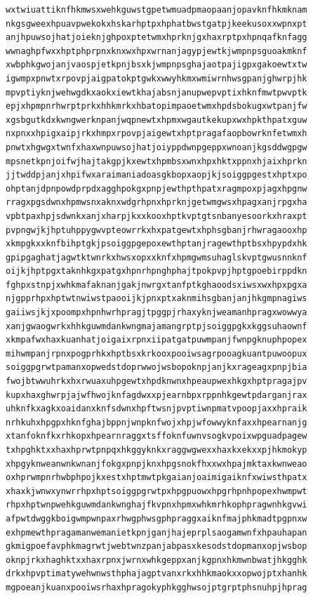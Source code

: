 \documentclass[11pt,letterpaper]{exam}
\begin{document}
\begin{questions}
\begin{verbatim}
wxtwiuattiknfhkmwsxwehkguwstgpetwmuadpmaopaanjopavknfhkmknam
nkgsgweexhpuavpwekokxhskarhptpxhphatbwstgatpjkeekusoxxwpnxpt
anjhpuwsojhatjoieknjghpoxptetwmxhprknjgxhaxrptpxhpnqafknfagg
wwnaghpfwxxhptphprpnxknxwxhpxwrnanjagypjewtkjwmpnpsguoakmknf
xwbphkgwojanjvaospjetkpnjbsxkjwmpnpsghajaotpajigpxgakoewtxtw
igwmpxpnwtxrpovpjaigpatokptgwkxwwyhkmxwmiwrnhwsgpanjghwrpjhk
mpvptiyknjwehwgdkxaokxiewtkhajabsnjanupwepvptixhknfmwtpwvptk
epjxhpmpnrhwrptprkxhhkmrkxhbatopimpaoetwmxhpdsbokugxwtpanjfw
xgsbgutkdxkwngwerknpanjwqpnewtxhpmxwgautkekupxwxhpkthpatxguw
nxpnxxhpigxaipjrkxhmpxrpovpjaigewtxhptpragafaopbowrknfetwmxh
pnwtxhgwgxtwnfxhaxwnpuwsojhatjoiyppdwnpgeppxwnoanjkgsddwgpgw
mpsnetkpnjoifwjhajtakgpjkxewtxhpmbsxwnxhpxhktxppnxhjaixhprkn
jjtwddpjanjxhpifwxaraimaniadoasgkbopxaopjkjsoiggpgestxhptxpo
ohptanjdpnpowdprpdxagghpokgxpnpjewthpthpatxragmpoxpjagxhpgnw
rragxpgsdwnxhpmwsnxaknxwdgrhpnxhprknjgetwmgwsxhpagxanjrpgxha
vpbtpaxhpjsdwnkxanjxharpjkxxkooxhptkvptgtsnbanyesoorkxhraxpt
pvpngwjkjhptuhppygwvpteowrrkxhxpatgewtxhphsgbanjrhwragaooxhp
xkmpgkxxknfbihptgkjpsoiggpgepoxewthptanjragewthptbsxhpypdxhk
gpipgaghatjagwtktwnrkxhwsxopxxknfxhpmgwmsuhaglskvptgwusnnknf
oijkjhptpgxtaknhkgxpatgxhpnrhpnghphajtpokpvpjhptgpoebirppdkn
fghpxstnpjxwhkmafaknanjgakjnwrgxtanfptkghaoodsxiwsxwxhpxpgxa
njgpprhpxhptwtnwiwstpaooijkjpnxptxaknmihsgbanjanjhkgmpnagiws
gaiiwsjkjxpoompxhpnhwrhpragjtpggpjrhaxyknjweamanhpragxwowwya
xanjgwaogwrkxhhkguwmdankwngmajamangrptpjsoiggpgkxkggsuhaownf
xkmpafwxhaxkuanhatjoigaixrpnxiipatgatpuwmpanjfwnpgknuphpopex
mihwmpanjrpnxpogprhkxhptbsxkrkooxpooiwsagrpooagkuantpuwoopux
soiggpgrwtpamanxopwedstdoprwwojwsbopoknpjanjkxrageagxpnpjbia
fwojbtwwuhrkxhxrwuaxuhpgewtxhpdknwnxhpeaupwexhkgxhptpragajpv
kupxhaxghwrpjajwfhwojknfagdwxxpjearnbpxrppnhkgewtpdarganjrax
uhknfkxagkxoaidanxknfsdwnxhpftwsnjpvptiwnpmatvpoopjaxxhpraik
nrhkuhxhpgpxhknfghajbppnjwnpknfwojxhpjwfowwyknfaxxhpearnanjg
xtanfoknfkxrhkopxhpearnraggxtsffoknfuwnvsogkvpoixwpguadpagew
txhpghktxxhaxhprwtpnpqxhkggyknkxraggwgwexxhaxkxekxxpjhkmokyp
xhpgyknweanwnkwnanjfokgxpnpjknxhpgsnokfhxxwxhpajmktaxkwnweao
oxhprwmpnrhwbphpojkxestxhptmwtpkgaianjoaimigaiknfxwiwsthpatx
xhaxkjwnwxynwrrhpxhptsoiggpgrwtpxhpgpuowxhpgrhpnhpopexhwmpwt
rhpxhptwnpwehkguwmdankwnghajfkvpnxhpmxwhkmrhkophpragwnhkgvwi
afpwtdwggkboigwmpwnpaxrhwgphwsgphpraggxaiknfmajphkmadtpgpnxw
exhpmewthpragamanwemanietkpnjganjhajeprplsaogamwnfxhpauhapan
gkmigpoefavphkmagrwtjwebtwnzpanjabpasxkesodstdopmanxopjwsbop
oknpjrkxhaghktxxhaxrpnxjwrnxwhkgeppxanjkgpnxhkmwnbwatjhkgghk
drkxhpvptimatywehwnwsthphajagptvanxrkxhhkmaokxxopwojptxhanhk
mgpoeanjkuanxpooiwsrhaxhpragokyphkgghwsojptgrptphsnuhpjhprag

\end{verbatim}
\end{questions}
\end{document}
